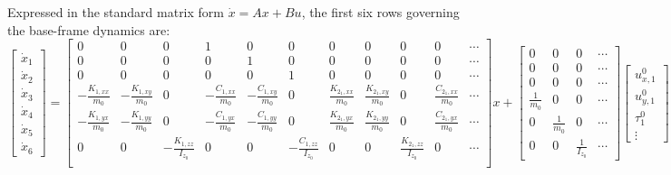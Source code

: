 \documentclass[11pt]{article}
\theoremstyle{definition}
\begin{document}
Expressed in the standard matrix form $\dot{x} = Ax + Bu$, the first six rows governing the base-frame dynamics are:
\setcounter{MaxMatrixCols}{20}
\begin{equation}
\begin{bmatrix}\dot{x}_1\\\dot{x}_2\\\dot{x}_3\\\dot{x}_4\\\dot{x}_5\\\dot{x}_6\end{bmatrix}
=
\begin{bmatrix}
    0 & 0 & 0 & 1 & 0 & 0 & 0 & 0 & 0 & 0 & \cdots \\
    0 & 0 & 0 & 0 & 1 & 0 & 0 & 0 & 0 & 0 & \cdots \\
    0 & 0 & 0 & 0 & 0 & 1 & 0 & 0 & 0 & 0 & \cdots \\
    -\frac{K_{1,xx}}{m_0} & -\frac{K_{1,xy}}{m_0} & 0 &
    -\frac{C_{1,xx}}{m_0} & -\frac{C_{1,xy}}{m_0} & 0 &
    \frac{K_{2_1,xx}}{m_0} & \frac{K_{2_1,xy}}{m_0} & 0 &
    \frac{C_{2_1,xx}}{m_0} & \cdots \\
    -\frac{K_{1,yx}}{m_0} & -\frac{K_{1,yy}}{m_0} & 0 &
    -\frac{C_{1,yx}}{m_0} & -\frac{C_{1,yy}}{m_0} & 0 &
    \frac{K_{2_1,yx}}{m_0} & \frac{K_{2_1,yy}}{m_0} & 0 &
    \frac{C_{2_1,yx}}{m_0} & \cdots \\
    0 & 0 & -\frac{K_{1,zz}}{I_{z_0}} & 0 & 0 &
    -\frac{C_{1,zz}}{I_{z_0}} & 0 & 0 &
    \frac{K_{2_1,zz}}{I_{z_0}} & 0 & \cdots \\
\end{bmatrix}
x
+
\begin{bmatrix}
    0 & 0 & 0 & \cdots \\
    0 & 0 & 0 & \cdots \\
    0 & 0 & 0 & \cdots \\
    \frac{1}{m_0} & 0 & 0 & \cdots \\
    0 & \frac{1}{m_0} & 0 & \cdots \\
    0 & 0 & \frac{1}{I_{z_0}} & \cdots
\end{bmatrix}
\begin{bmatrix}u^0_{x,1}\\u^0_{y,1}\\\tau^0_1\\\vdots\end{bmatrix}
\end{equation}
\end{document}
